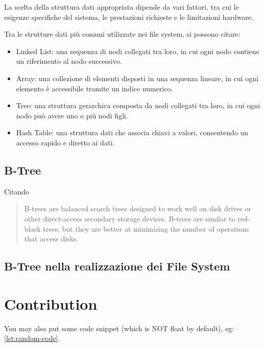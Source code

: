 \documentclass[12pt,a4paper,openright,twoside]{book}
\begin{document}
        La scelta della struttura dati appropriata dipende da vari fattori, tra cui le esigenze specifiche del sistema, le prestazioni richieste e le limitazioni hardware.

        Tra le strutture dati più comuni utilizzate nei file system, si possono citare:

        \begin{itemize}
            \item Linked List: una sequenza di nodi collegati tra loro, in cui ogni nodo contiene un riferimento al nodo successivo.
            \item Array: una collezione di elementi disposti in una sequenza lineare, in cui ogni elemento è accessibile tramite un indice numerico.
            \item Tree: una struttura gerarchica composta da nodi collegati tra loro, in cui ogni nodo può avere uno o più nodi figli.
            \item Hash Table: una struttura dati che associa chiavi a valori, consentendo un accesso rapido e diretto ai dati.
        \end{itemize}

    \section{B-Tree}

        Citando
        \begin{quote}
            B-trees are balanced search trees designed to work well on disk drives or other direct-access secondary storage devices. B-trees are similar to red-black trees, but they are better at minimizing the number of operations that access disks.
        \end{quote}

    \section{B-Tree nella realizzazione dei File System}

\chapter{Contribution}

You may also put some code snippet (which is NOT float by default), eg: \cref{lst:random-code}.


\end{document}
